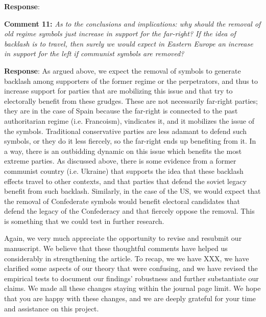 \documentclass[12pt, a4paper, notitlepage]{article}
\begin{document}
\textbf{Response}: {\color{red}{pending}}

\textbf{Comment 11:} \textit{As to the conclusions and implications: why should the removal of old regime symbols just increase in support for the far-right? If the idea of backlash is to travel, then surely we would expect in Eastern Europe an increase in support for the left if communist symbols are removed?}

\textbf{Response}: As argued above, we expect the removal of symbols to generate backlash among supporters of the former regime or the perpetrators, and thus to increase support for parties that are mobilizing this issue and that try to electorally benefit from these grudges. These are not necessarily far-right parties; they are in the case of Spain because the far-right is connected to the past authoritarian regime (i.e. Francoism), vindicates it, and it mobilizes the issue of the symbols. Traditional conservative parties are less adamant to defend such symbols, or they do it less fiercely, so the far-right ends up benefiting from it. In a way, there is an outbidding dynamic\citep{Kydd:2002aa} on this issue which benefits the most extreme parties. As discussed above, there is some evidence from a former communist country (i.e. Ukraine) that supports the idea that these backlash effects travel to other contexts, and that parties that defend the soviet legacy benefit from such backlash. Similarly, in the case of the US, we would expect that the removal of Confederate symbols would benefit electoral candidates that defend the legacy of the Confederacy and that fiercely oppose the removal. This is something that we could test in further research.

\vspace{30pt}

Again, we very much appreciate the opportunity to revise and resubmit our manuscript. We believe that these thoughtful comments have helped us considerably in strengthening the article. To recap, we we have XXX, we have clarified some aspects of our theory that were confusing, and we have revised the empirical tests to document our findings' robustness and further substantiate our claims. We made all these changes staying within the journal page limit. We hope that you are happy with these changes, and we are deeply grateful for your time and assistance on this project.


\newpage


\end{document}
